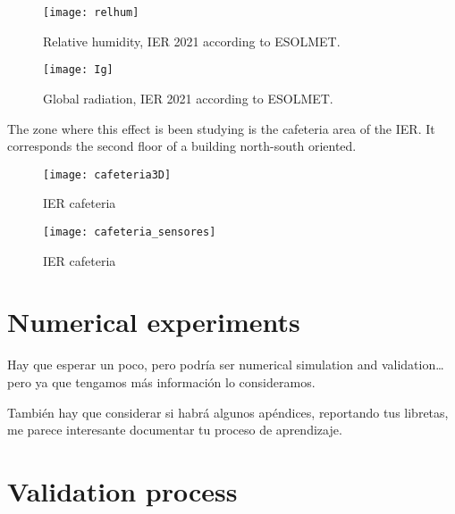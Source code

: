 \begin{figure}
 \centering
 \texttt{[image: relhum]}
 \caption{	
 Relative humidity, IER 2021 according to ESOLMET.
 \label{fig:rh}
 }
\end{figure}


\begin{figure}
 \centering
 \texttt{[image: Ig]}
 \caption{	
 Global radiation, IER 2021 according to ESOLMET.
 \label{fig:Ig}
 }
\end{figure}



The zone where this effect is been studying is the cafeteria area of the IER. It corresponds the second floor of a building north-south oriented. 

\begin{figure}
 \centering
 \texttt{[image: cafeteria3D]}
 \caption{	
 IER cafeteria
 \label{fig:3D}
 }
\end{figure}

\begin{figure}
 \centering
 \texttt{[image: cafeteria\_sensores]}
 \caption{	
 IER cafeteria
 \label{fig:sensores}
 }
\end{figure}







 
 
 \section{Numerical experiments}
 
 Hay que esperar un poco, pero podría ser numerical simulation and validation… pero ya que tengamos más información lo consideramos.


También hay que considerar si habrá algunos apéndices, reportando tus libretas, me parece interesante documentar tu proceso de aprendizaje.
 
 \section{Validation process}
 
